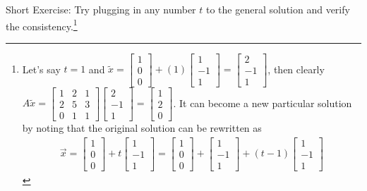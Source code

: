 Short Exercise: Try plugging in any number $t$ to the general solution and verify the consistency.\footnote{Let's say $t=1$ and $\tilde{x} = 
\begin{bmatrix}
1 \\
0 \\
0
\end{bmatrix}
+ (1)
\begin{bmatrix}
1 \\
-1 \\
1
\end{bmatrix}
=
\begin{bmatrix}
2 \\
-1 \\
1
\end{bmatrix}$, then clearly $A\tilde{x} = 
\begin{bmatrix}
1 & 2 & 1 \\
2 & 5 & 3 \\
0 & 1 & 1 
\end{bmatrix}
\begin{bmatrix}
2 \\
-1 \\
1
\end{bmatrix}
= 
\begin{bmatrix}
1 \\
2 \\
0
\end{bmatrix}$. It can become a new particular solution by noting that the original solution can be rewritten as
\begin{align*}
\vec{x} =
\begin{bmatrix}
1 \\
0 \\
0
\end{bmatrix}
+ t
\begin{bmatrix}
1 \\
-1 \\
1
\end{bmatrix}
= 
\begin{bmatrix}
1 \\
0 \\
0
\end{bmatrix}
+
\begin{bmatrix}
1 \\
-1 \\
1
\end{bmatrix}
+
(t-1)
\begin{bmatrix}
1 \\
-1 \\
1
\end{bmatrix}

\end{align*}}
